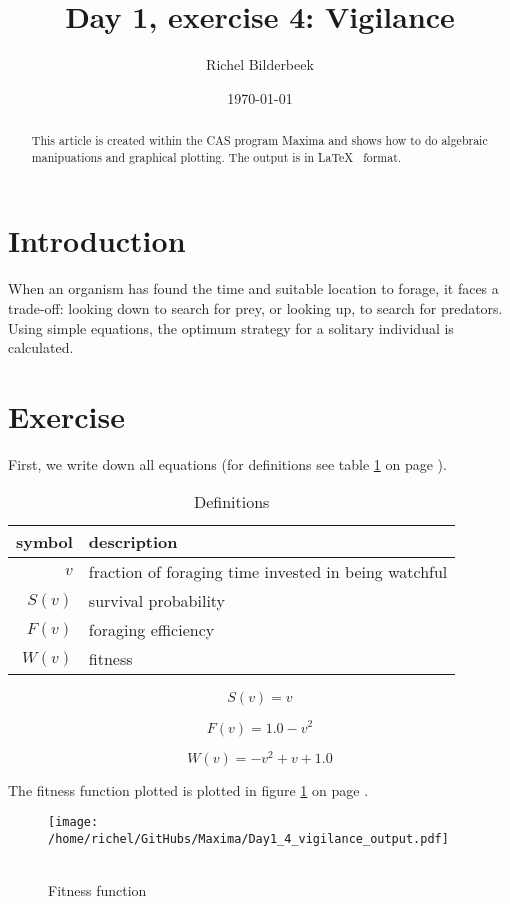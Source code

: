 \documentclass{article}
\title{Day 1, exercise 4: Vigilance}
\author{Richel Bilderbeek}
\date{\today}
\begin{document}
\maketitle

\begin{abstract}
This article is created within the CAS program Maxima
and shows how to do algebraic manipuations and graphical plotting.
The output is in \LaTeX~ format.
\end{abstract}

\section{Introduction}

When an organism has found the time and suitable location to forage, it faces a trade-off:
looking down to search for prey, or looking up, to search for predators. Using simple
equations, the optimum strategy for a solitary individual is calculated.

\section{Exercise}
First, we write down all equations
(for definitions see table \ref{table:table_definition} on page \pageref{table:table_definition}).

\begin{table}[here]
  \centering
  \begin{tabular}{ | r | l | }
    \hline
    symbol & description \\
    \hline
    $v$ & fraction of foraging time invested in being watchful \\
    $S(v)$ & survival probability \\
    $F(v)$ & foraging efficiency \\
    $W(v)$ & fitness \\
    \hline
  \end{tabular}
  \caption{Definitions}
  \label{table:table_definition}
\end{table}

$$S\left(v\right)=v$$

$$F\left(v\right)=1.0-v^2$$

$$W\left(v\right)=-v^2+v+1.0$$

The fitness function plotted is plotted in figure 
\ref{figure:figure_fitness} on page \pageref{figure:figure_fitness}.\\

\begin{figure}[here]
\texttt{[image: /home/richel/GitHubs/Maxima/Day1\_4\_vigilance\_output.pdf]}\\\\
  \caption{Fitness function}
  \label{figure:figure_fitness}
\end{figure}
\end{document}
